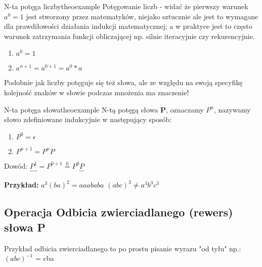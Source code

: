		\begin{mytheo}{N-ta potęga liczby}{theoexample}
			Potęgowanie liczb - widać że pierwszy warunek $a^{0} = 1$ jest stworzony przez
			 matematyków, niejako sztucznie ale jest to wymagane dla prawdiłowości działania
			 indukcji matematycznej; a w praktyce jest to często warunek zatrzymania funkcji
			 obliczającej np. silnie iteracyjnie czy rekurencyjnie.
		
			\begin{enumerate}[label=(\roman*)]
				\item $a^{0} = 1$
				
				\item $a^{n+1} = a^{0+1}=a^{0}*a$
			\end{enumerate} 
		\end{mytheo}
	
	
		Podobnie jak liczby potęguje się też słowa, ale ze względu na swoją specyfikę
		kolejność znaków w słowie podczas mnożenia ma znaczenie!
	
		\begin{mytheo}{N-ta potęga słowa}{theoexample}
			N-tą potęgą słowa \textbf{P}, oznaczamy \textbf{$P^{n}$}, nazywamy słowo 
			zdefiniowane indukcyjnie w następujący sposób:
		
			\begin{enumerate}[label=(\roman*)]
				\item $P^{0} = \epsilon$
				\item $P^{n+1} = P^{n}P$
			\end{enumerate} 
					
			Dowód:
			$\underbrace{P^{1}}_{}= P^{0+1} \overset{\mathrm{ii}}{=}  P^{0}\underbrace{P}$		

		\end{mytheo}
		
		\begin{tcolorbox}
			\textbf{Przykład:} \newline
			$a^{3}(ba)^{2}= aaababa$ \newline
			$(abc)^{3} \neq a^{3}b^{3}c^{3}$
		\end{tcolorbox}
	
	
	
	\subsection{Operacja Odbicia zwierciadlanego (rewers) słowa P}
		Przykład odbicia zwierciadlanego to po prostu pisanie wyrazu "od tyłu" \newline
		np.: $(abc)^{-1}$ = cba \newline
				
